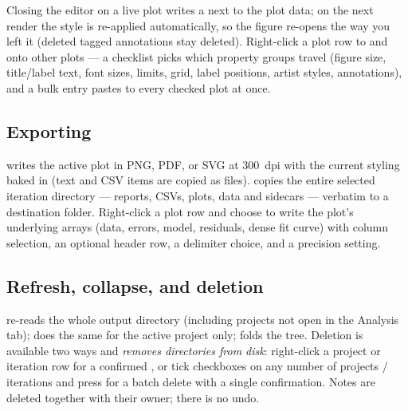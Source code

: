Closing the editor on a live  plot writes a
 next to the plot data; on the next render the
style is re-applied automatically, so the figure re-opens the way
you left it (deleted tagged annotations stay deleted). Right-click a
plot row to  and  onto
other plots --- a checklist picks which property groups travel
(figure size, title/label text, font sizes, limits, grid, label
positions, artist styles, annotations), and a bulk entry pastes to
every checked plot at once.

\subsection{Exporting}

 writes the active plot in PNG, PDF, or SVG at 300~dpi
with the current styling baked in (text and CSV items are copied as
files).  copies the entire selected iteration
directory --- reports, CSVs, plots,  data and
 sidecars --- verbatim to a destination folder.
Right-click a plot row and choose  to
write the plot's underlying arrays (data, errors, model, residuals,
dense fit curve) with column selection, an optional header row, a
delimiter choice, and a precision setting.

\subsection{Refresh, collapse, and deletion}

 re-reads the whole output directory (including
projects not open in the Analysis tab);  does
the same for the active project only;  folds the
tree. Deletion is available two ways and \emph{removes directories
from disk}: right-click a project or iteration row for a confirmed
, or tick checkboxes on any number of projects /
iterations and press  for a batch delete with a
single confirmation. Notes are deleted together with their owner;
there is no undo.
